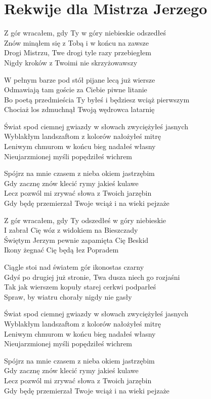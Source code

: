 \section{Rekwije dla Mistrza Jerzego}
\begin{text}
\footnotesize{Z gór wracałem, gdy Ty w góry niebieskie odszedłeś\\
Znów minąłem się z Tobą i w końcu na zawsze\\
Drogi Mistrzu, Twe drogi tyle razy przebiegłem\\
Nigdy kroków z Twoimi nie skrzyżowawszy

W pełnym barze pod stół pijane lecą już wiersze\\
Odmawiają tam goście za Ciebie piwne litanie\\
Bo poetą przedmieścia Ty byłeś i będziesz wciąż pierwszym\\
Chociaż los zdmuchnął Twoją wędrowca latarnię

Świat spod ciemnej gwiazdy w słowach zwyciężyłeś jasnych\\
Wyblakłym landszaftom z kolorów nałożyłeś mitrę\\
Leniwym chmurom w końcu bieg nadałeś własny\\
Nieujarzmionej myśli popędziłeś wichrem

Spójrz na mnie czasem z nieba okiem jastrzębim\\
Gdy zacznę znów klecić rymy jakieś kulawe\\
Lecz pozwól mi zrywać słowa z Twoich jarzębin\\
Gdy będę przemierzał Twoje wciąż i na wieki pejzaże

Z gór wracałem, gdy Ty odszedłeś w góry niebieskie\\
I zabrał Cię wóz z widokiem na Bieszczady\\
Świętym Jerzym pewnie zapamięta Cię Beskid\\
Ikony żegnać Cię będą łez Popradem

Ciągle stoi nad światem gór ikonostas czarny\\
Gdyś po drugiej już stronie, Twa dusza niech go rozjaśni\\
Tak jak wierszem kopuły starej cerkwi podparłeś\\
Spraw, by wiatru chorały nigdy nie gasły

Świat spod ciemnej gwiazdy w słowach zwyciężyłeś jasnych\\
Wyblakłym landszaftom z kolorów nałożyłeś mitrę\\
Leniwym chmurom w końcu bieg nadałeś własny\\
Nieujarzmionej myśli popędziłeś wichrem

Spójrz na mnie czasem z nieba okiem jastrzębim\\
Gdy zacznę znów klecić rymy jakieś kulawe\\
Lecz pozwól mi zrywać słowa z Twoich jarzębin\\
Gdy będę przemierzał Twoje wciąż i na wieki pejzaże}
\end{text}